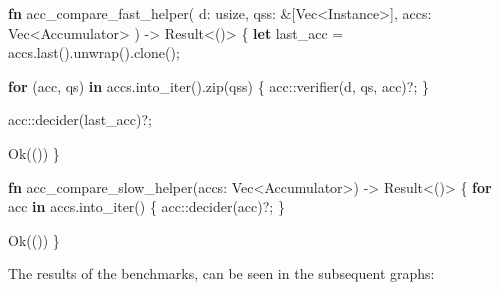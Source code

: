 \documentclass[
]{article}
\newenvironment{Shaded}{\begin{snugshade}}{\end{snugshade}}
\newcommand{\ConstantTok}[1]{\textcolor[rgb]{0.80,0.14,0.11}{#1}}
\newcommand{\ControlFlowTok}[1]{\textcolor[rgb]{0.80,0.14,0.11}{\textbf{#1}}}
\newcommand{\DataTypeTok}[1]{\textcolor[rgb]{0.71,0.46,0.08}{#1}}
\newcommand{\KeywordTok}[1]{\textcolor[rgb]{0.80,0.14,0.11}{\textbf{#1}}}
\newcommand{\NormalTok}[1]{\textcolor[rgb]{0.16,0.16,0.16}{#1}}
\newcommand{\OperatorTok}[1]{\textcolor[rgb]{0.56,0.25,0.44}{#1}}
\newcommand{\PreprocessorTok}[1]{\textcolor[rgb]{0.03,0.40,0.47}{#1}}
\begin{document}
\begin{Shaded}
\begin{Highlighting}[numbers=left,,]
  \KeywordTok{fn}\NormalTok{ acc\_compare\_fast\_helper(}
\NormalTok{    d}\OperatorTok{:} \DataTypeTok{usize}\OperatorTok{,}
\NormalTok{    qss}\OperatorTok{:} \OperatorTok{\&}\NormalTok{[}\DataTypeTok{Vec}\OperatorTok{\textless{}}\NormalTok{Instance}\OperatorTok{\textgreater{}}\NormalTok{]}\OperatorTok{,}
\NormalTok{    accs}\OperatorTok{:} \DataTypeTok{Vec}\OperatorTok{\textless{}}\NormalTok{Accumulator}\OperatorTok{\textgreater{}}
\NormalTok{  ) }\OperatorTok{{-}\textgreater{}} \DataTypeTok{Result}\OperatorTok{\textless{}}\NormalTok{()}\OperatorTok{\textgreater{}} \OperatorTok{\{}
      \KeywordTok{let}\NormalTok{ last\_acc }\OperatorTok{=}\NormalTok{ accs}\OperatorTok{.}\NormalTok{last()}\OperatorTok{.}\NormalTok{unwrap()}\OperatorTok{.}\NormalTok{clone()}\OperatorTok{;}

      \ControlFlowTok{for}\NormalTok{ (acc}\OperatorTok{,}\NormalTok{ qs) }\KeywordTok{in}\NormalTok{ accs}\OperatorTok{.}\NormalTok{into\_iter()}\OperatorTok{.}\NormalTok{zip(qss) }\OperatorTok{\{}
          \PreprocessorTok{acc::}\NormalTok{verifier(d}\OperatorTok{,}\NormalTok{ qs}\OperatorTok{,}\NormalTok{ acc)}\OperatorTok{?;}
      \OperatorTok{\}}

      \PreprocessorTok{acc::}\NormalTok{decider(last\_acc)}\OperatorTok{?;}

      \ConstantTok{Ok}\NormalTok{(())}
  \OperatorTok{\}}

  \KeywordTok{fn}\NormalTok{ acc\_compare\_slow\_helper(accs}\OperatorTok{:} \DataTypeTok{Vec}\OperatorTok{\textless{}}\NormalTok{Accumulator}\OperatorTok{\textgreater{}}\NormalTok{) }\OperatorTok{{-}\textgreater{}} \DataTypeTok{Result}\OperatorTok{\textless{}}\NormalTok{()}\OperatorTok{\textgreater{}} \OperatorTok{\{}
      \ControlFlowTok{for}\NormalTok{ acc }\KeywordTok{in}\NormalTok{ accs}\OperatorTok{.}\NormalTok{into\_iter() }\OperatorTok{\{}
          \PreprocessorTok{acc::}\NormalTok{decider(acc)}\OperatorTok{?;}
      \OperatorTok{\}}

      \ConstantTok{Ok}\NormalTok{(())}
  \OperatorTok{\}}
\end{Highlighting}
\end{Shaded}

The results of the benchmarks, can be seen in the subsequent graphs:
\end{document}
